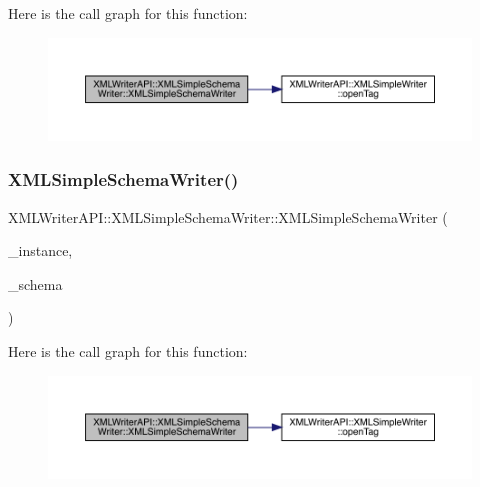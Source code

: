 Here is the call graph for this function\+:
\nopagebreak
\begin{figure}[H]
\begin{center}
\leavevmode
\includegraphics[width=350pt]{db/d0b/classXMLWriterAPI_1_1XMLSimpleSchemaWriter_a309425b6927188991ba8fb9d19e0caca_cgraph}
\end{center}
\end{figure}
\mbox{\label{classXMLWriterAPI_1_1XMLSimpleSchemaWriter_a309425b6927188991ba8fb9d19e0caca}} 
\subsubsection{\texorpdfstring{XMLSimpleSchemaWriter()}{XMLSimpleSchemaWriter()}\hspace{0.1cm}{\footnotesize\ttfamily [3/3]}}
{\footnotesize\ttfamily X\+M\+L\+Writer\+A\+P\+I\+::\+X\+M\+L\+Simple\+Schema\+Writer\+::\+X\+M\+L\+Simple\+Schema\+Writer (\begin{DoxyParamCaption}\item[{\mbox{\hyperlink{classXMLWriterAPI_1_1XMLSimpleWriter}{X\+M\+L\+Simple\+Writer}} \&}]{\+\_\+instance,  }\item[{\mbox{\hyperlink{classXMLWriterAPI_1_1XMLSimpleWriter}{X\+M\+L\+Simple\+Writer}} \&}]{\+\_\+schema }\end{DoxyParamCaption})\hspace{0.3cm}{\ttfamily [inline]}}

Here is the call graph for this function\+:
\nopagebreak
\begin{figure}[H]
\begin{center}
\leavevmode
\includegraphics[width=350pt]{db/d0b/classXMLWriterAPI_1_1XMLSimpleSchemaWriter_a309425b6927188991ba8fb9d19e0caca_cgraph}
\end{center}
\end{figure}


